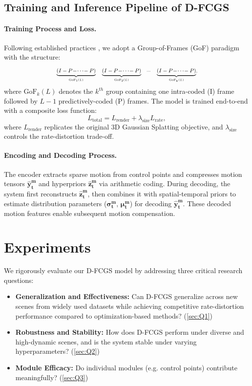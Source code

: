 \documentclass[letterpaper]{article} %
\begin{document}
\subsection{Training and Inference Pipeline of D-FCGS}
\label{sec:training}

\paragraph{\textbf{Training Process and Loss.}}
Following established practices \cite{wang2023neural, zheng2024hpc, zheng2024jointrf}, we adopt a Group-of-Frames (GoF) paradigm with the structure:
\begin{equation}
\scalebox{0.8}{$\scriptstyle
\underbrace{(I-P\!-\!\cdots\!-P)}_{\text{GoF}_1(L)} \quad
\underbrace{(I-P\!-\!\cdots\!-P)}_{\text{GoF}_2(L)} \quad
\cdots \quad
\underbrace{(I-P\!-\!\cdots\!-P)}_{\text{GoF}_k(L)},$}
\end{equation}
where $\text{GoF}_k(L)$ denotes the $k^{th}$ group containing one intra-coded (I) frame followed by $L-1$ predictively-coded (P) frames. The model is trained end-to-end with a composite loss function:
\begin{equation}
L_{\text{total}} = L_{\text{render}} + \lambda_{\text{size}} L_{\text{rate}},
\end{equation}
where $L_{\text{render}}$ replicates the original 3D Gaussian Splatting objective, and $\lambda_{\text{size}}$ controls the rate-distortion trade-off.

\paragraph{\textbf{Encoding and Decoding Process.}}
The encoder extracts sparse motion from control points and compresses motion tensors $\boldsymbol{\hat{y}^m_t}$ and hyperpriors $\boldsymbol{\hat{z}^m_t}$ via arithmetic coding. During decoding, the system first reconstructs $\boldsymbol{\hat{z}^m_t}$, then combines it with spatial-temporal priors to estimate distribution parameters ($\boldsymbol{\sigma^m_t}$, $\boldsymbol{\mu^m_t}$) for decoding $\boldsymbol{\hat{y}^m_t}$. These decoded motion features enable subsequent motion compensation.


\section{Experiments}
We rigorously evaluate our D-FCGS model by addressing three critical research questions:
\begin{itemize}
\item \textbf{Generalization and Effectiveness:} Can D-FCGS generalize across new scenes from widely used datasets while achieving competitive rate-distortion performance compared to optimization-based methods? (\cref{sec:Q1})
\item \textbf{Robustness and Stability:} How does D-FCGS perform under diverse and high-dynamic scenes, and is the system stable under varying hyperparameters? (\cref{sec:Q2})
\item \textbf{Module Efficacy:} Do individual modules (e.g. control points) contribute meaningfully? (\cref{sec:Q3})
\end{itemize}
\end{document}

